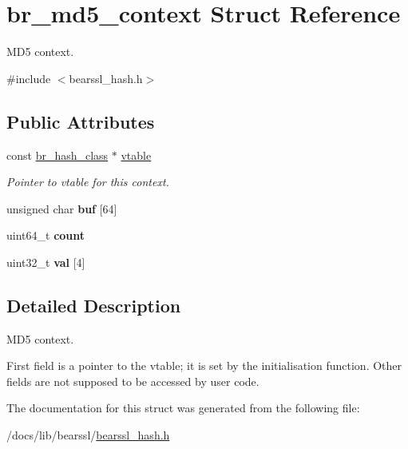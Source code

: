 \hypertarget{structbr__md5__context}{}\section{br\+\_\+md5\+\_\+context Struct Reference}
\label{structbr__md5__context}


M\+D5 context.  




{\ttfamily \#include $<$bearssl\+\_\+hash.\+h$>$}

\subsection*{Public Attributes}
\begin{DoxyCompactItemize}
\item 
\mbox{\label{structbr__md5__context_a74653b79b12521810c4d880a384de058}} 
const \hyperlink{bearssl__hash_8h_ae38c1b9d539537cc16fc84388b922d86}{br\+\_\+hash\+\_\+class} $\ast$ \hyperlink{structbr__md5__context_a74653b79b12521810c4d880a384de058}{vtable}
\begin{DoxyCompactList}\small\item\em Pointer to vtable for this context. \end{DoxyCompactList}\item 
\mbox{\label{structbr__md5__context_a621e0329bd4a39ddf95f16768f96e7d8}} 
unsigned char {\bfseries buf} \mbox{[}64\mbox{]}
\item 
\mbox{\label{structbr__md5__context_a242cecaceca9afe1e0d7283c998c5332}} 
uint64\+\_\+t {\bfseries count}
\item 
\mbox{\label{structbr__md5__context_a8c24cc73471581b3c7ece6856787b49a}} 
uint32\+\_\+t {\bfseries val} \mbox{[}4\mbox{]}
\end{DoxyCompactItemize}


\subsection{Detailed Description}
M\+D5 context. 

First field is a pointer to the vtable; it is set by the initialisation function. Other fields are not supposed to be accessed by user code. 

The documentation for this struct was generated from the following file\+:\begin{DoxyCompactItemize}
\item 
/docs/lib/bearssl/\hyperlink{bearssl__hash_8h}{bearssl\+\_\+hash.\+h}\end{DoxyCompactItemize}
